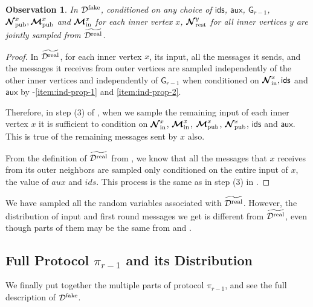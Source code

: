 \documentclass[11pt]{article}
\newtheorem{observation}[lemma]{Observation}
\theoremstyle{definition}
\newcommand{\rv}[1]{\ensuremath{{\mathsf{#1}}}\xspace}
\newcommand{\prot}{\ensuremath{\pi}}
\newcommand{\rNinner}[2]{\ensuremath{\bm{\mathcal{N}}_{\textnormal{in}}^{#1_{#2}}}}
\newcommand{\cD}{\ensuremath{\mathcal{D}}}
\newcommand{\cDreal}{\ensuremath{\cD^{\textnormal{real}}}}
\newcommand{\cDrealtil}{\ensuremath{\widetilde{\cDreal}}}
\newcommand{\cDfake}{\ensuremath{\cD^{\textnormal{fake}}}}
\newcommand{\ids}{\ensuremath{ids}}
\newcommand{\aux}{\ensuremath{aux}}
\newcommand{\raux}{\ensuremath{\rv{aux}}}
\newcommand{\rNpub}[1]{\ensuremath{\bm{\mathcal{N}}_{\textnormal{pub}}^{#1}}}
\newcommand{\rMpub}[1]{\ensuremath{\bm{\mathcal{M}}_{\textnormal{pub}}^{#1}}}
\newcommand{\rMinner}[1]{\ensuremath{\bm{\mathcal{M}}_{\textnormal{in}}^{#1}}}
\newcommand{\rNrest}[1]{\ensuremath{\bm{\mathcal{N}}^{#1}_{\textnormal{rest}}}}
\newcommand{\rG}{\ensuremath{\rv{G}}}
\newcommand{\rids}{\ensuremath{\rv{ids}}}
\begin{document}
\begin{observation}\label{obs:rest-input-correct}
In $\cDfake$, conditioned on any choice of $\rids$, $\raux$, $\rG_{r-1}$, $\rNpub{x}, \rMpub{x}$ and $\rMinner{x}$ for each inner vertex $x$, $\rNrest{y}$ for all inner vertices $y$ are jointly sampled from $\cDrealtil$. 
\end{observation}
\begin{proof}
	In $\cDrealtil$, for each inner vertex $x$, its input, all the messages it sends, and the messages it receives from outer vertices are sampled independently of the other inner vertices and independently of $\rG_{r-1}$ when conditioned on $\rNinner{x}{}, \rids$ and $\raux$ by -\ref{item:ind-prop-1} and \ref{item:ind-prop-2}.
	
	Therefore, in step (3) of , when we sample the remaining input of each inner vertex $x$ it is sufficient to condition on $\rNinner{x}{}$, $\rMinner{x}$, $\rMpub{x}$, $\rNpub{x}$, $\rids$ and $\raux$. This is true of the remaining messages sent by $x$ also. 
	
	From the definition of $\cDrealtil$ from , we know that all the messages that $x$ receives from its outer neighbors are sampled only conditioned on the entire input of $x$, the value of $\aux$ and $\ids$. This process is the same as in  step (3) in .
\end{proof}



We have sampled all the random variables associated with $\cDrealtil$. However, the distribution of input and first round messages we get is different from $\cDrealtil$, even though parts of them may be the same from  and .


\subsection{Full Protocol $\prot_{r-1}$ and its Distribution}\label{sec:fake-protocol}
We finally put together the multiple parts of protocol $\prot_{r-1}$, and see the full description of $\cDfake$. 
\end{document}
